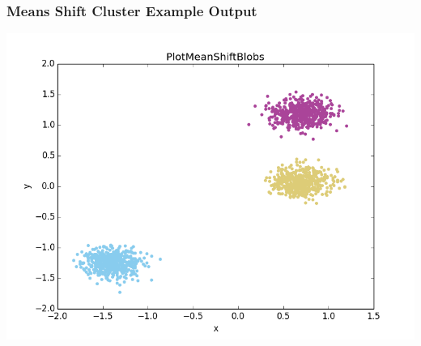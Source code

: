 \documentclass[t,9pt,svgnames]{beamer}
\begin{document}
\begin{frame}
  \frametitle{Means Shift Cluster Example Output}
  \includegraphics[width=\textwidth]{images/PlotMeanShift.png}
\end{frame}
\end{document}
